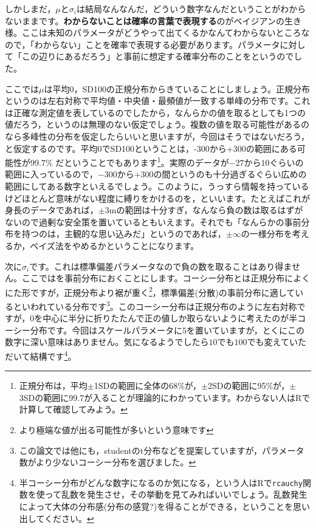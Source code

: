 \documentclass{ltjsbook}
\begin{document}
しかしまだ，$\mu$と$\sigma_i$は結局なんなんだ，どういう数字なんだということがわからないままです。\textbf{わからないことは確率の言葉で表現する}のがベイジアンの生き様。ここは未知のパラメータがどうやって出てくるかなんてわからないところなので，「わからない」ことを確率で表現する必要があります。パラメータに対して「この辺りにあるだろう」と事前に想定する確率分布のことをというのでした。

ここでは$\mu$は平均0，SD100の正規分布からきていることにしましょう。正規分布というのは左右対称で平均値・中央値・最頻値が一致する単峰の分布です。これは正確な測定値を表しているのでしたから，なんらかの値を取るとしても1つの値だろう，というのは無理のない仮定でしょう。複数の値を取る可能性があるのなら多峰性の分布を仮定したらいいと思いますが，今回はそうではないだろう，と仮定するのです。平均0でSD100ということは，-300から+300の範囲にある可能性が99.7\% だということでもあります\footnote{正規分布は，平均$\pm$1SDの範囲に全体の68\%が，$\pm$2SDの範囲に95\%が，$\pm$3SDの範囲に99.7が入ることが理論的にわかっています。わからない人はRで計算して確認してみよう。}。実際のデータが$-27$から$10$ぐらいの範囲に入っているので，$-300$から$+300$の間というのも十分過ぎるぐらい広めの範囲にしてある数字といえるでしょう。このように，うっすら情報を持っているけどほとんど意味がない程度に縛りをかけるのを，といいます。たとえばこれが身長のデータであれば，$\pm$3mの範囲は十分すぎ，なんなら負の数は取るはずがないので過剰な安全策を置いているともいえます。それでも「なんらかの事前分布を持つのは，主観的な思い込みだ」というのであれば，$\pm \infty$の一様分布を考えるか，ベイズ法をやめるかということになります。

次に$\sigma_i$です。これは標準偏差パラメータなので負の数を取ることはあり得ません。ここではを事前分布におくことにします。コーシー分布とは正規分布によくにた形ですが，正規分布より裾が重く\footnote{より極端な値が出る可能性が多いという意味です}，標準偏差(分散)の事前分布に適しているといわれている分布です\citep{gelman2006prior}\footnote{この論文では他にも，studentのt分布などを提案していますが，パラメータ数がより少ないコーシー分布を選びました。}。このコーシー分布は正規分布のように左右対称ですが，0を中心に半分に折りたたんで正の値しか取らないように考えたのが半コーシー分布です。今回はスケールパラメータに$5$を置いていますが，とくにこの数字に深い意味はありません。気になるようでしたら$10$でも$100$でも変えていただいて結構です\footnote{半コーシー分布がどんな数字になるのか気になる，という人はRで\texttt{rcauchy}関数を使って乱数を発生させ，その挙動を見てみればいいでしょう。乱数発生によって大体の分布感(分布の感覚?)を得ることができる，ということを思い出してください。}。
\end{document}
